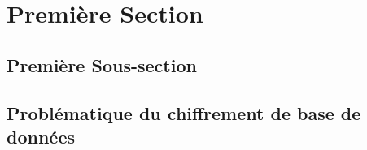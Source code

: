 

\section*{Première Section} %
\label{sec:resume_section_1}


\subsection*{Première Sous-section} %
\label{sub:sous_secion_1}

\lipsum[1-4]

\subsection*{Problématique du chiffrement de base de données} %
\label{sub:sous_secion_2}

\lipsum[5-8]



